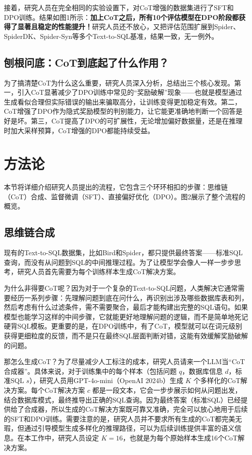 接着，研究人员在完全相同的实验设置下，对CoT增强的数据集进行了SFT和DPO训练。结果如图1所示：\textbf{加上CoT之后，所有10个评估模型在DPO阶段都获得了显著且稳定的性能提升！}研究人员还不放心，又把评估范围扩展到Spider、SpiderDK、Spider-Syn等多个Text-to-SQL基准，结果一致，无一例外。

\subsection{刨根问底：CoT到底起了什么作用？}
为了搞清楚CoT为什么这么重要，研究人员深入分析，总结出三个核心发现。第一，引入CoT显著减少了DPO训练中常见的“奖励破解”现象——也就是模型通过生成看似合理但实际错误的输出来骗取高分，让训练变得更加稳定有效。第二，CoT增强了DPO作为隐式奖励模型的判别能力，让它能更准确地判断一个回答是好是坏。第三，CoT提高了DPO的可扩展性，无论增加偏好数据量，还是在推理时加大采样预算，CoT增强的DPO都能持续受益。

\section{方法论}
本节将详细介绍研究人员提出的流程，它包含三个环环相扣的步骤：思维链（CoT）合成、监督微调（SFT）、直接偏好优化（DPO）。图2展示了整个流程的概览。

\subsection{思维链合成}
现有的Text-to-SQL数据集，比如Bird和Spider，都只提供最终答案——标准SQL查询，而没有从问题到SQL的中间推理过程。为了让模型学会像人一样一步步思考，研究人员首先需要为每个训练样本生成CoT解决方案。

为什么非得要CoT呢？因为对于一个复杂的Text-to-SQL问题，人类解决它通常需要经历一系列步骤：先理解问题到底在问什么，再识别出涉及哪些数据库表和列，然后考虑有什么过滤条件，需不需要聚合，最后才能构建出完整的SQL语句。如果模型也能学习这样的中间步骤，它就能更好地理解问题的逻辑，而不是简单地死记硬背SQL模板。更重要的是，在DPO训练中，有了CoT，模型就可以在词元级别获得更细粒度的反馈，而不是只在最终SQL层面判断对错，这能有效缓解奖励破解的问题。

那怎么生成CoT？为了尽量减少人工标注的成本，研究人员请来一个LLM当“CoT合成器”。具体来说，对于训练集中的每个样本（包括问题 \(q\)，数据库信息 \(d\)，标准SQL \(s\)），研究人员用GPT-4o-mini（OpenAI 2024b）生成 \(K\) 个多样化的CoT解决方案。每个CoT解决方案 \(c\) 都是一段文本，它会一步步展示如何从问题出发，结合数据库模式，最终推导出正确的SQL查询。因为最终答案（标准SQL）已经提供给了合成器，所以生成的CoT解决方案既可靠又准确，完全可以放心地用于后续的SFT和DPO训练。需要注意的是，研究人员并不要求所有生成的CoT都完美无瑕，但通过引导模型生成多样化的推理路径，可以为后续训练提供丰富的语义信息。在本工作中，研究人员设定 \(K=16\)，也就是为每个原始样本生成16个CoT解决方案。


